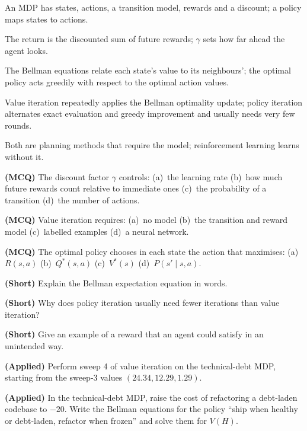 \begin{chaptersummary}
\begin{tight}
  \item An MDP has states, actions, a transition model, rewards and a discount; a
        policy maps states to actions.
  \item The return is the discounted sum of future rewards; $\gamma$ sets how far
        ahead the agent looks.
  \item The Bellman equations relate each state's value to its neighbours'; the
        optimal policy acts greedily with respect to the optimal action values.
  \item Value iteration repeatedly applies the Bellman optimality update; policy
        iteration alternates exact evaluation and greedy improvement and usually
        needs very few rounds.
  \item Both are planning methods that require the model; reinforcement learning
        learns without it.
\end{tight}
\end{chaptersummary}

\begin{reviewq}
  \item \textbf{(MCQ)} The discount factor $\gamma$ controls: (a)~the learning rate
        (b)~how much future rewards count relative to immediate ones (c)~the
        probability of a transition (d)~the number of actions.
  \item \textbf{(MCQ)} Value iteration requires: (a)~no model (b)~the transition and
        reward model (c)~labelled examples (d)~a neural network.
  \item \textbf{(MCQ)} The optimal policy chooses in each state the action that
        maximises: (a)~$R(s, a)$ (b)~$Q^{*}(s, a)$ (c)~$V^{*}(s)$ (d)~$P(s' \mid s, a)$.
  \item \textbf{(Short)} Explain the Bellman expectation equation in words.
  \item \textbf{(Short)} Why does policy iteration usually need fewer iterations than
        value iteration?
  \item \textbf{(Short)} Give an example of a reward that an agent could satisfy in an
        unintended way.
  \item \textbf{(Applied)} Perform sweep 4 of value iteration on the technical-debt
        MDP, starting from the sweep-3 values $(24.34, 12.29, 1.29)$.
  \item \textbf{(Applied)} In the technical-debt MDP, raise the cost of refactoring
        a debt-laden codebase to $-20$. Write the Bellman equations for the policy
        ``ship when healthy or debt-laden, refactor when frozen'' and solve them for
        $V(H)$.
\end{reviewq}
